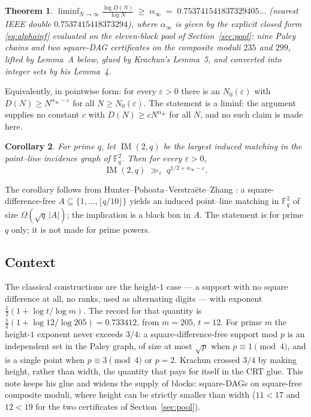 \documentclass[11pt]{amsart}
\theoremstyle{plain}
\newtheorem{theorem}{Theorem}
\newtheorem{corollary}[theorem]{Corollary}
\theoremstyle{remark}
\newcommand{\F}{\mathbb{F}}
\DeclareMathOperator{\IM}{IM}
\begin{document}
\begin{theorem}\label{thm:main}
$\displaystyle \liminf_{N\to\infty} \frac{\log D(N)}{\log N} \;\ge\;
\alpha_\infty \;=\; 0.753741541837329405\dots$
\emph{(nearest IEEE double $0.7537415418373294$)}, where $\alpha_\infty$ is
given by the explicit closed form \eqref{eq:alphainf} evaluated on the
eleven-block pool of Section~\ref{sec:pool}: nine Paley chains and two
square-DAG certificates on the composite moduli $235$ and $299$, lifted by
Lemma~A below, glued by Krachun's Lemma~5, and converted into integer sets by
his Lemma~4.
\end{theorem}

Equivalently, in pointwise form: for every $\varepsilon > 0$ there is an
$N_0(\varepsilon)$ with $D(N) \ge N^{\alpha_\infty - \varepsilon}$ for all
$N \ge N_0(\varepsilon)$. The statement is a liminf: the argument supplies no
constant $c$ with $D(N) \ge c N^{\alpha_\infty}$ for all $N$, and no such
claim is made here.

\begin{corollary}\label{cor:im}
For prime $q$, let $\IM(2,q)$ be the largest induced matching in the
point--line incidence graph of $\F_q^2$. Then for every $\varepsilon > 0$,
\[
\IM(2,q) \;\gg_\varepsilon\; q^{1/2 + \alpha_\infty - \varepsilon}.
\]
\end{corollary}

The corollary follows from Hunter--Pohoata--Verstra\"ete--Zhang
\cite[Prop.~2.3]{HPVZ}: a square-difference-free
$A \subseteq \{1,\dots,\lfloor q/10\rfloor\}$ yields an induced point--line
matching in $\F_q^2$ of size $\Omega(\sqrt{q}\,|A|)$; the implication is a
black box in $A$. The statement is for prime $q$ only; it is not made for
prime powers.

\subsection*{Context}
The classical constructions are the height-$1$ case --- a support with no
square difference at all, no ranks, used as alternating digits --- with
exponent $\tfrac12(1 + \log t/\log m)$. The record for that quantity is
$\tfrac12(1 + \log 12/\log 205) = 0.733412$, from $m = 205$, $t = 12$. For
prime $m$ the height-$1$ exponent never exceeds $3/4$: a
square-difference-free support mod $p$ is an independent set in the Paley
graph, of size at most $\sqrt{p}$ when $p \equiv 1 \pmod 4$, and is a single
point when $p \equiv 3 \pmod 4$ or $p = 2$. Krachun \cite{Krachun} crossed
$3/4$ by making height, rather than width, the quantity that pays for itself
in the CRT glue. This note keeps his glue and widens the supply of blocks:
square-DAGs on square-free composite moduli, where height can be strictly
smaller than width ($11 < 17$ and $12 < 19$ for the two certificates of
Section~\ref{sec:pool}).
\end{document}
